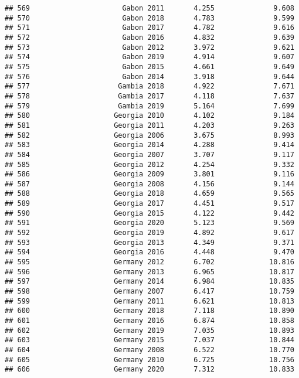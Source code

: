 \documentclass[
]{article}
\begin{document}
\begin{verbatim}
## 569                      Gabon 2011       4.255              9.608
## 570                      Gabon 2018       4.783              9.599
## 571                      Gabon 2017       4.782              9.616
## 572                      Gabon 2016       4.832              9.639
## 573                      Gabon 2012       3.972              9.621
## 574                      Gabon 2019       4.914              9.607
## 575                      Gabon 2015       4.661              9.649
## 576                      Gabon 2014       3.918              9.644
## 577                     Gambia 2018       4.922              7.671
## 578                     Gambia 2017       4.118              7.637
## 579                     Gambia 2019       5.164              7.699
## 580                    Georgia 2010       4.102              9.184
## 581                    Georgia 2011       4.203              9.263
## 582                    Georgia 2006       3.675              8.993
## 583                    Georgia 2014       4.288              9.414
## 584                    Georgia 2007       3.707              9.117
## 585                    Georgia 2012       4.254              9.332
## 586                    Georgia 2009       3.801              9.116
## 587                    Georgia 2008       4.156              9.144
## 588                    Georgia 2018       4.659              9.565
## 589                    Georgia 2017       4.451              9.517
## 590                    Georgia 2015       4.122              9.442
## 591                    Georgia 2020       5.123              9.569
## 592                    Georgia 2019       4.892              9.617
## 593                    Georgia 2013       4.349              9.371
## 594                    Georgia 2016       4.448              9.470
## 595                    Germany 2012       6.702             10.816
## 596                    Germany 2013       6.965             10.817
## 597                    Germany 2014       6.984             10.835
## 598                    Germany 2007       6.417             10.759
## 599                    Germany 2011       6.621             10.813
## 600                    Germany 2018       7.118             10.890
## 601                    Germany 2016       6.874             10.858
## 602                    Germany 2019       7.035             10.893
## 603                    Germany 2015       7.037             10.844
## 604                    Germany 2008       6.522             10.770
## 605                    Germany 2010       6.725             10.756
## 606                    Germany 2020       7.312             10.833

\end{verbatim}
\end{document}
